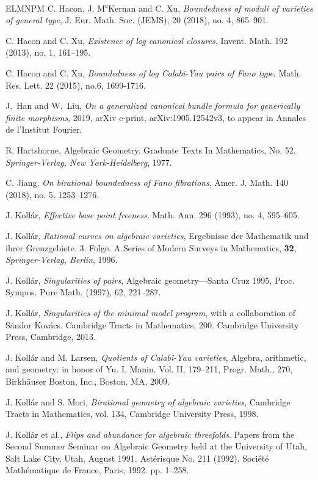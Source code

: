 \documentclass{amsart}[12pt,a4paper]
\theoremstyle{definition}
\begin{document}
\begin{thebibliography}{ELMNPM}
C. Hacon, J. M\textsuperscript{c}Kernan and C. Xu, 
\textit{Boundedness of moduli of varieties of general type},
J. Eur. Math. Soc. (JEMS), 20 (2018), no. 4, 865--901.

 C. Hacon and C. Xu, 
\textit{Existence of log canonical closures}, 
Invent. Math. 192 (2013), no. 1, 161--195. 

 C. Hacon and C. Xu, 
\textit{ Boundedness of log Calabi-Yau pairs of Fano type}, Math. Res. Lett. 22 (2015), no.6, 1699-1716.

 J.~Han and W.~Liu, \textit{On a generalized canonical bundle formula for generically finite morphisms}, 2019,
arXiv e-print, arXiv:1905.12542v3,
to appear in Annales de l'Institut Fourier.

 R. Hartshorne, Algebraic Geometry. Graduate Texts In Mathematics, No. 52. \textit{Springer-Verlag, New York-Heidelberg},
1977.

 C. Jiang, \textit{On birational boundedness of Fano fibrations},  Amer. J. Math. 140 (2018), no. 5, 1253--1276.

 J. Koll\'{a}r, 
\textit{Effective base point freeness}.
Math. Ann. 296 (1993), no. 4, 595--605.

 J. Koll\'ar, \textit{Rational curves on algebraic varieties},
  Ergebnisse der Mathematik und ihrer Grenzgebiete. 3. Folge. A Series of Modern Surveys in Mathematics, {\bf 32}, {\it Springer-Verlag, Berlin}, 1996.

 J. Koll\'ar, \textit{Singularities of pairs}, Algebraic geometry---{S}anta {C}ruz 1995,
Proc. Sympos. Pure Math. (1997), 62, 221--287.

 J. Koll\'ar, \textit{Singularities of the minimal model program},
with a collaboration of S\'andor Kov\'acs. Cambridge Tracts in Mathematics, 200. Cambridge University Press, Cambridge, 2013.

 J. Koll\'ar and M. Larsen, \textit{Quotients of Calabi-Yau varieties}, 
Algebra, arithmetic, and geometry: in honor of Yu. I. Manin. Vol. II, 179--211,
Progr. Math., 270, Birkh\"auser Boston, Inc., Boston, MA, 2009. 

 J. Koll\'ar and S. Mori, \textit{Birational geometry of algebraic varieties},
Cambridge Tracts in Mathematics, vol. 134, Cambridge University Press, 1998. 

J. Koll\'ar et al., 
{\it Flips and abundance for algebraic threefolds}. 
Papers from the Second Summer Seminar on Algebraic Geometry held at the University of Utah, Salt Lake City, Utah, August 1991. 
Ast\'erisque No. 211 (1992). 
Soci\'et\'e Math\'ematique de France, Paris, 1992. 
pp. 1--258.


\end{thebibliography}
\end{document}
